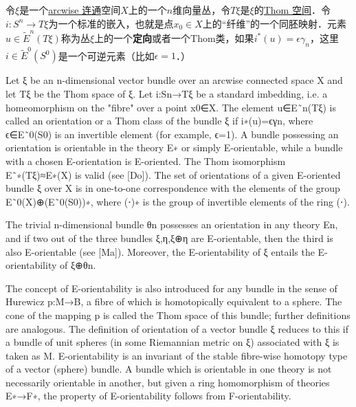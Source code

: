 
令$\xi$是一个\href{https://encyclopediaofmath.org/wiki/Path-connected_space}{arcwise 连通}空间$X$上的一个$n$维向量丛，令$T\xi$是$\xi$的\href{https://encyclopediaofmath.org/wiki/Thom_space}{Thom 空间}．令$i:S^n\to T\xi$为一个标准的嵌入，也就是点$x_0\in X$上的“纤维”的一个同胚映射．元素$u\in \widetilde{E}^n(T\xi)$称为丛$\xi$上的一个\textbf{定向}或者一个Thom类，如果$i^*(u)=\epsilon \gamma_n$，这里$i\in\widetilde{E}^0(S^0)$是一个可逆元素（比如$\epsilon=1$．）

Let ξ be an n-dimensional vector bundle over an arcwise connected space X and let Tξ be the Thom space of ξ. Let i:Sn→Tξ be a standard imbedding, i.e. a homeomorphism on the "fibre" over a point x0∈X. The element u∈E˜n(Tξ) is called an orientation or a Thom class of the bundle ξ if i∗(u)=ϵγn, where ϵ∈E˜0(S0) is an invertible element (for example, ϵ=1). A bundle possessing an orientation is orientable in the theory E∗ or simply E-orientable, while a bundle with a chosen E-orientation is E-oriented. The Thom isomorphism E˜∗(Tξ)≈E∗(X) is valid (see [Do]). The set of orientations of a given E-oriented bundle ξ over X is in one-to-one correspondence with the elements of the group E˜0(X)⊕(E˜0(S0))∗, where (⋅)∗ is the group of invertible elements of the ring (⋅).

The trivial n-dimensional bundle θn possesses an orientation in any theory En, and if two out of the three bundles ξ,η,ξ⊕η are E-orientable, then the third is also E-orientable (see [Ma]). Moreover, the E-orientability of ξ entails the E-orientability of ξ⊕θn.

The concept of E-orientability is also introduced for any bundle in the sense of Hurewicz p:M→B, a fibre of which is homotopically equivalent to a sphere. The cone of the mapping p is called the Thom space of this bundle; further definitions are analogous. The definition of orientation of a vector bundle ξ reduces to this if a bundle of unit spheres (in some Riemannian metric on ξ) associated with ξ is taken as M. E-orientability is an invariant of the stable fibre-wise homotopy type of a vector (sphere) bundle. A bundle which is orientable in one theory is not necessarily orientable in another, but given a ring homomorphism of theories E∗→F∗, the property of E-orientability follows from F-orientability.

















